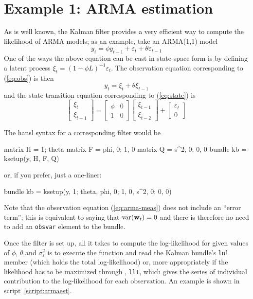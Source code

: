 \documentclass[a4paper]{article}
\begin{document}
\section{Example 1: ARMA estimation}
\label{sec:example_arma}

As is well known, the Kalman filter provides a very efficient way to
compute the likelihood of ARMA models; as an example, take an
ARMA(1,1) model
\[
  y_t = \phi y_{t-1} + \varepsilon_t + \theta \varepsilon_{t-1}
\]
One of the ways the above equation can be cast in state-space form is
by defining a latent process $\xi_t = (1 - \phi L)^{-1}
\varepsilon_t$.   The observation equation corresponding to (\ref{eq:obs})
is then
%
\begin{equation}
y_t = \xi_t + \theta \xi_{t-1} \label{eq:arma-meas}
\end{equation}
%
and the state transition equation corresponding to (\ref{eq:state}) is
%
\[
  \left[ \begin{array}{c} \xi_t \\ \xi_{t-1} \end{array} \right] =
  \left[ \begin{array}{cc} \phi & 0 \\ 1 & 0 \end{array} \right]
  \left[ \begin{array}{c} \xi_{t-1} \\ \xi_{t-2} \end{array} \right] +
  \left[ \begin{array}{c} \varepsilon_t \\ 0 \end{array} \right] 
\]

The \textsf{hansl} syntax for a corresponding filter would be
\begin{code}
matrix H = {1; theta}
matrix F = {phi, 0; 1, 0}
matrix Q = {s^2, 0; 0, 0}
bundle kb = ksetup(y, H, F, Q)
\end{code}
%
or, if you prefer, just a one-liner:
\begin{code}
bundle kb = ksetup(y, {1; theta}, {phi, 0; 1, 0}, {s^2, 0; 0, 0})
\end{code}

Note that the observation equation (\ref{eq:arma-meas}) does not
include an ``error term''; this is equivalent to saying that
$\mbox{var}(\mathbf{w}_t) = 0$ and there is therefore no need to add
an \texttt{obsvar} element to the bundle.

Once the filter is set up, all it takes to compute the log-likelihood
for given values of $\phi$, $\theta$ and $\sigma^2_{\varepsilon}$ is
to execute the  function and read the Kalman
bundle's \texttt{lnl} member (which holds the total log-likelihood)
or, more appropriately if the likelihood has to be maximized through
, \texttt{llt}, which gives the series of individual
contribution to the log-likelihood for each observation. An example is
shown in script~\ref{script:armaest}.
\end{document}
